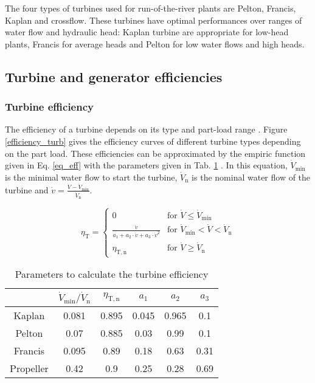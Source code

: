 The four types of turbines used for run-of-the-river plants are Pelton, Francis, Kaplan and crossflow. These turbines have optimal performances over ranges of water flow and hydraulic head: Kaplan turbine are appropriate for low-head plants, Francis for average heads and Pelton for low water flows and high heads.   

\subsection{Turbine and generator efficiencies}
\label{eff_turb_gen}

\subsubsection{Turbine efficiency}
The efficiency of a turbine depends on its type and part-load range \cite{quaschning}\cite{pacer}. Figure \ref{efficiency_turb} gives the efficiency curves of different turbine types depending on the part load. These efficiencies can be approximated by the empiric function given in Eq. \eqref{eq_eff} with the parameters given in Tab. \ref{eff_param} \cite{quaschning}. In this equation, $\dot{V}_\mathrm{min}$ is the minimal water flow to start the turbine, $\dot{V}_\mathrm{n}$ is the nominal water flow of the turbine and $\dot{v}=\frac{\dot{V}-\dot{V}_\mathrm{min}}{\dot{V}_\mathrm{n}}$.

\begin{equation}
 \label{eq_eff}
\eta_\mathrm{T}= \left\{
    \begin{array}{ll}
	0 & \mbox{for } \dot{V} \leq \dot{V}_\mathrm{min}\\
        \frac{\dot{v}}{a_\mathrm{1}+a_\mathrm{2} \cdot \dot{v} + a_\mathrm{3} \cdot \dot{v}^2} & \mbox{for } \dot{V}_\mathrm{min}<\dot{V}<\dot{V}_\mathrm{n} \\
        \eta_\mathrm{T,n} & \mbox{for } \dot{V} \geq \dot{V}_\mathrm{n}
    \end{array}
\right.
\end{equation}


\begin{table}[H]
 \centering
 \caption[Parameters to calculate the turbine efficiency]{Parameters to calculate the turbine efficiency \cite{quaschning}}
 \footnotesize
 \label{eff_param}
 \begin{tabular}{|c|c|c|c|c|c|}
  \cline{2-6}
  \multicolumn{1}{c|}{}&$\dot{V}_\mathrm{min} / \dot{V}_\mathrm{n}$ & $\eta_\mathrm{T,n}$& $a_\mathrm{1}$ & $a_\mathrm{2}$&$a_\mathrm{3}$ \\ 
  \hline
  Kaplan & 0.081& 0.895& 0.045 &0.965& 0.1 \\
  Pelton & 0.07& 0.885& 0.03& 0.99& 0.1\\
  Francis &0.095 &0.89 &0.18 &0.63 &0.31 \\
  Propeller &0.42 &0.9 &0.25 &0.28 &0.69\\
  \hline
 \end{tabular}
\end{table}

